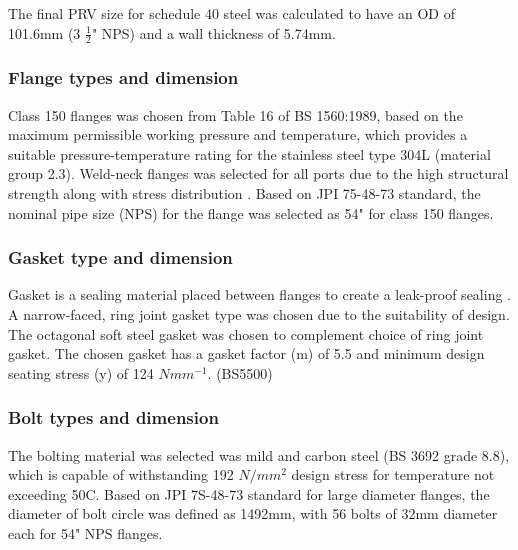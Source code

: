 The final PRV size for schedule 40 steel was calculated to have an OD of 101.6mm (3 $\frac{1}{2}$" NPS) and a wall thickness of 5.74mm.



\subsubsection{Flange types and dimension}
Class 150 flanges was chosen from Table 16 of BS 1560:1989, based on the maximum permissible working pressure and temperature, which provides a suitable pressure-temperature rating for the stainless steel type 304L (material group 2.3). Weld-neck flanges was selected for all ports due to the high structural strength along with stress distribution \cite{ulma_forge_welding_2020}.
Based on JPI 75-48-73 standard, the nominal pipe size (NPS) for the flange was selected as 54" for class 150 flanges.
\subsubsection{Gasket type and dimension}
Gasket is a sealing material placed between flanges to create a leak-proof sealing \cite{varun_piping_nodate}. A narrow-faced, ring joint gasket type was chosen due to the suitability of design. The octagonal soft steel gasket was chosen to complement choice of ring joint gasket. The chosen gasket has a gasket factor (m) of 5.5 and minimum design seating stress (y) of 124 $Nmm^{-1}$. (BS5500)

\subsubsection{Bolt types and dimension}
The bolting material was selected was mild and carbon steel (BS 3692 grade 8.8), which is capable of withstanding 192 $N/mm^2$ design stress for temperature not exceeding 50C. Based on JPI 7S-48-73 standard for large diameter flanges, the diameter of bolt circle was defined as 1492mm, with 56 bolts of 32mm diameter each for 54" NPS flanges. 

